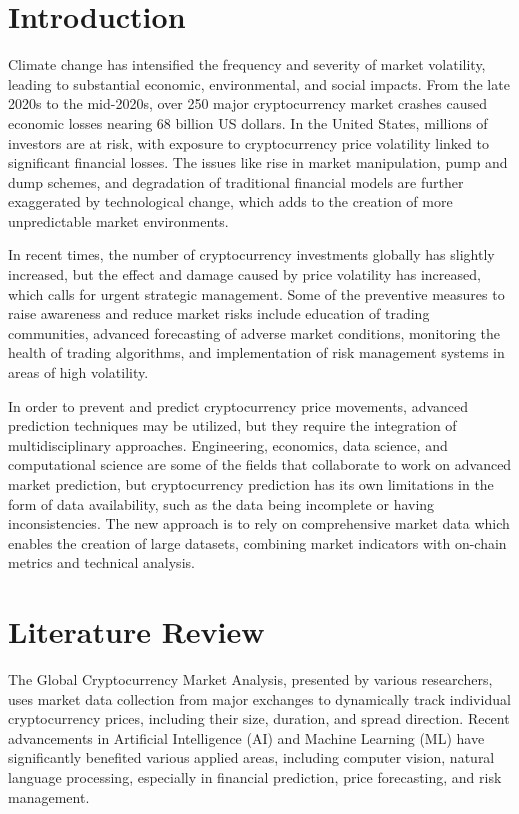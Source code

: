 \documentclass[conference]{IEEEtran}
\begin{document}
\section{Introduction}

Climate change has intensified the frequency and severity of market volatility, leading to substantial economic, environmental, and social impacts. From the late 2020s to the mid-2020s, over 250 major cryptocurrency market crashes caused economic losses nearing 68 billion US dollars. In the United States, millions of investors are at risk, with exposure to cryptocurrency price volatility linked to significant financial losses. The issues like rise in market manipulation, pump and dump schemes, and degradation of traditional financial models are further exaggerated by technological change, which adds to the creation of more unpredictable market environments.

In recent times, the number of cryptocurrency investments globally has slightly increased, but the effect and damage caused by price volatility has increased, which calls for urgent strategic management. Some of the preventive measures to raise awareness and reduce market risks include education of trading communities, advanced forecasting of adverse market conditions, monitoring the health of trading algorithms, and implementation of risk management systems in areas of high volatility.

In order to prevent and predict cryptocurrency price movements, advanced prediction techniques may be utilized, but they require the integration of multidisciplinary approaches. Engineering, economics, data science, and computational science are some of the fields that collaborate to work on advanced market prediction, but cryptocurrency prediction has its own limitations in the form of data availability, such as the data being incomplete or having inconsistencies. The new approach is to rely on comprehensive market data which enables the creation of large datasets, combining market indicators with on-chain metrics and technical analysis.

\section{Literature Review}

The Global Cryptocurrency Market Analysis, presented by various researchers, uses market data collection from major exchanges to dynamically track individual cryptocurrency prices, including their size, duration, and spread direction. Recent advancements in Artificial Intelligence (AI) and Machine Learning (ML) have significantly benefited various applied areas, including computer vision, natural language processing, especially in financial prediction, price forecasting, and risk management.
\end{document}

